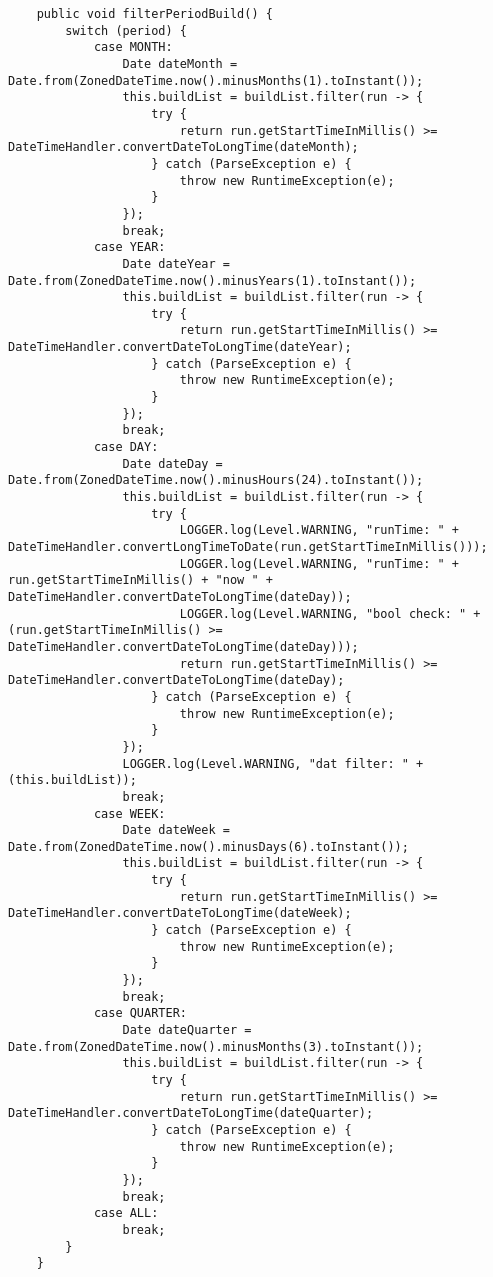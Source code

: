 \begin{lstlisting}
    public void filterPeriodBuild() {
        switch (period) {
            case MONTH:
                Date dateMonth = Date.from(ZonedDateTime.now().minusMonths(1).toInstant());
                this.buildList = buildList.filter(run -> {
                    try {
                        return run.getStartTimeInMillis() >= DateTimeHandler.convertDateToLongTime(dateMonth);
                    } catch (ParseException e) {
                        throw new RuntimeException(e);
                    }
                });
                break;
            case YEAR:
                Date dateYear = Date.from(ZonedDateTime.now().minusYears(1).toInstant());
                this.buildList = buildList.filter(run -> {
                    try {
                        return run.getStartTimeInMillis() >= DateTimeHandler.convertDateToLongTime(dateYear);
                    } catch (ParseException e) {
                        throw new RuntimeException(e);
                    }
                });
                break;
            case DAY:
                Date dateDay = Date.from(ZonedDateTime.now().minusHours(24).toInstant());
                this.buildList = buildList.filter(run -> {
                    try {
                        LOGGER.log(Level.WARNING, "runTime: " + DateTimeHandler.convertLongTimeToDate(run.getStartTimeInMillis()));
                        LOGGER.log(Level.WARNING, "runTime: " + run.getStartTimeInMillis() + "now " + DateTimeHandler.convertDateToLongTime(dateDay));
                        LOGGER.log(Level.WARNING, "bool check: " + (run.getStartTimeInMillis() >= DateTimeHandler.convertDateToLongTime(dateDay)));
                        return run.getStartTimeInMillis() >= DateTimeHandler.convertDateToLongTime(dateDay);
                    } catch (ParseException e) {
                        throw new RuntimeException(e);
                    }
                });
                LOGGER.log(Level.WARNING, "dat filter: " + (this.buildList));
                break;
            case WEEK:
                Date dateWeek = Date.from(ZonedDateTime.now().minusDays(6).toInstant());
                this.buildList = buildList.filter(run -> {
                    try {
                        return run.getStartTimeInMillis() >= DateTimeHandler.convertDateToLongTime(dateWeek);
                    } catch (ParseException e) {
                        throw new RuntimeException(e);
                    }
                });
                break;
            case QUARTER:
                Date dateQuarter = Date.from(ZonedDateTime.now().minusMonths(3).toInstant());
                this.buildList = buildList.filter(run -> {
                    try {
                        return run.getStartTimeInMillis() >= DateTimeHandler.convertDateToLongTime(dateQuarter);
                    } catch (ParseException e) {
                        throw new RuntimeException(e);
                    }
                });
                break;
            case ALL:
                break;
        }
    }


\end{lstlisting}
